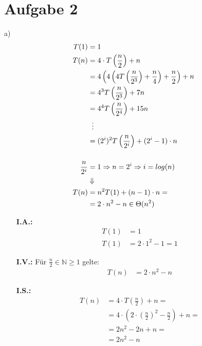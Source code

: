 \section*{Aufgabe 2}
a) \begin{align*}
	T(1) &= 1 \\
    T(n) &= 4 \cdot T\left( \frac{n}{2} \right) + n \\
    &= 4\left( 4\left( 4T\left( \frac{n}{2^3} \right) + \frac{n}{4} \right) + \frac{n}{2} \right) + n \\
    &= 4^3T\left( \frac{n}{2^3} \right) + 7n \\
    &= 4^4T\left( \frac{n}{2^4} \right) + 15n \\
    &\hphantom{..} \vdots \\
    &= (2^i)^2T\left( \frac{n}{2^i} \right) + (2^i - 1) \cdot n \\[0.5cm]
    \frac{n}{2^i} &= 1 \Rightarrow n = 2^i \Rightarrow i = log(n) \\
    &\Downarrow \\
    T(n) &= n^2 T(1) + (n - 1) \cdot n = \\
    &= 2 \cdot n^2 - n \in \Theta(n^2)
\end{align*}

\begin{itemize}[nolistsep, noitemsep]
	\item[\textbf{I.A.:}] \begin{align*}
    		T(1) &= 1 \\
            T(1) &= 2 \cdot 1^2 - 1 = 1
    	\end{align*}
	\item[\textbf{I.V.:}] Für $\frac{n}{2} \in \mathbb{N} \geq 1$ gelte: \begin{align*}
    		T(n) &= 2 \cdot n^2 - n
    	\end{align*}
	\item[\textbf{I.S.:}] \begin{align*}
    		T(n) &= 4 \cdot T \left( \frac{n}{2} \right) + n = \\
            &= 4 \cdot \left( 2 \cdot \left( \frac{n}{2} \right)^2 - \frac{n}{2} \right) + n = \\
            &= 2n^2 - 2n + n = \\
            &= 2n^2 - n
    	\end{align*}
\end{itemize}
\nuffsaid

\newpage

